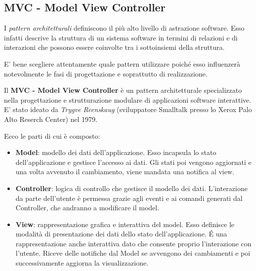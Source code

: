 		
		\subsection{MVC - Model View Controller}\label{def:MVC}
			\nocite{MVC-Slide}
			I \textit{pattern architetturali} definiscono il più alto livello di astrazione software. 
			Esso infatti descrive la struttura di un sistema software in termini di relazioni e di interazioni che possono essere coinvolte tra i sottoinsiemi della struttura. 
			
			E' bene scegliere attentamente quale pattern utilizzare poiché esso influenzerà notevolmente le fasi di progettazione e soprattutto di realizzazione. 
			
			Il \textbf{MVC - Model View Controller} è un pattern architetturale specializzato nella progettazione e strutturazione modulare di applicazioni software interattive.
			E' stato ideato da \textit{Trygve Reenskaug} (sviluppatore Smalltalk presso lo Xerox Palo Alto Reserch Center) nel 1979.
			
			Ecco le parti di cui è composto: 
			\begin{itemize}
				\item \textbf{Model}: modello dei dati dell'applicazione. Esso incapsula lo stato dell'applicazione e gestisce l'accesso ai dati. Gli stati poi vengono aggiornati e una volta avvenuto il cambiamento, viene mandata una notifica al view.

				\item \textbf{Controller}: logica di controllo che gestisce il modello dei dati. L'interazione da parte dell'utente è permessa grazie agli eventi e ai comandi generati dal Controller, che andranno a modificare il model.
			
				\item \textbf{View}: rappresentazione grafica e interattiva del model. Esso definisce le modalità di presentazione dei dati dello stato dell'applicazione. \'E una rappresentazione anche interattiva dato che consente proprio l'interazione con l'utente. 
				Riceve delle notifiche dal Model se avvengono dei cambiamenti e poi successivamente aggiorna la visualizzazione. 
			\end{itemize}
			
			\begin{center}
				\label{img:MVCClass}
			\end{center}
			
